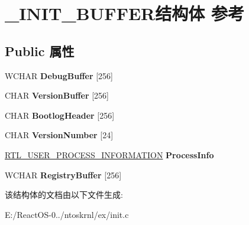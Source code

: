 \hypertarget{struct___i_n_i_t___b_u_f_f_e_r}{}\section{\+\_\+\+I\+N\+I\+T\+\_\+\+B\+U\+F\+F\+E\+R结构体 参考}
\label{struct___i_n_i_t___b_u_f_f_e_r}
\subsection*{Public 属性}
\begin{DoxyCompactItemize}
\item 
\mbox{\label{struct___i_n_i_t___b_u_f_f_e_r_a5760d1f7c9efbce0aa3e00583c79b9a8}} 
W\+C\+H\+AR {\bfseries Debug\+Buffer} \mbox{[}256\mbox{]}
\item 
\mbox{\label{struct___i_n_i_t___b_u_f_f_e_r_ab27ab3e3b49f8af0f90d30300b8c5049}} 
C\+H\+AR {\bfseries Version\+Buffer} \mbox{[}256\mbox{]}
\item 
\mbox{\label{struct___i_n_i_t___b_u_f_f_e_r_a429c66f1fa9fc06f13dadf79b779f85b}} 
C\+H\+AR {\bfseries Bootlog\+Header} \mbox{[}256\mbox{]}
\item 
\mbox{\label{struct___i_n_i_t___b_u_f_f_e_r_afb889a4d82b8fafbb3215c60e44e0963}} 
C\+H\+AR {\bfseries Version\+Number} \mbox{[}24\mbox{]}
\item 
\mbox{\label{struct___i_n_i_t___b_u_f_f_e_r_a927e9f4692e95ba68e41663619dcecde}} 
\hyperlink{struct___r_t_l___u_s_e_r___p_r_o_c_e_s_s___i_n_f_o_r_m_a_t_i_o_n}{R\+T\+L\+\_\+\+U\+S\+E\+R\+\_\+\+P\+R\+O\+C\+E\+S\+S\+\_\+\+I\+N\+F\+O\+R\+M\+A\+T\+I\+ON} {\bfseries Process\+Info}
\item 
\mbox{\label{struct___i_n_i_t___b_u_f_f_e_r_aa52756a3d81612670f1b4c84f2a2d89c}} 
W\+C\+H\+AR {\bfseries Registry\+Buffer} \mbox{[}256\mbox{]}
\end{DoxyCompactItemize}


该结构体的文档由以下文件生成\+:\begin{DoxyCompactItemize}
\item 
E\+:/\+React\+O\+S-\/0../ntoskrnl/ex/init.\+c\end{DoxyCompactItemize}
